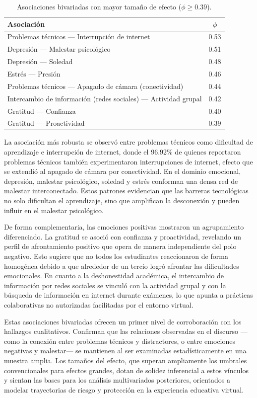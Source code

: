 \documentclass[conference]{IEEEtran}
\begin{document}
\begin{table}[htbp]
\centering
\begin{tabular}{@{}p{}c@{}}
\toprule
\textbf{Asociación} & \textbf{$\phi$} \\
\midrule
Problemas técnicos --- Interrupción de internet & 0.53 \\
Depresión --- Malestar psicológico & 0.51 \\
Depresión --- Soledad & 0.48 \\
Estrés --- Presión & 0.46 \\
Problemas técnicos --- Apagado de cámara (conectividad) & 0.44 \\
Intercambio de información (redes sociales) --- Actividad grupal & 0.42 \\
Gratitud --- Confianza & 0.40 \\
Gratitud --- Proactividad & 0.39 \\
\bottomrule
\end{tabular}
\caption{Asociaciones bivariadas con mayor tamaño de efecto ($\phi \geq 0.39$).}
\label{tab:bivariado}
\end{table}

La asociación más robusta se observó entre problemas técnicos como dificultad de aprendizaje e interrupción de internet, donde el 96.92\% de quienes reportaron problemas técnicos también experimentaron interrupciones de internet, efecto que se extendió al apagado de cámara por conectividad. En el dominio emocional, depresión, malestar psicológico, soledad y estrés conforman una densa red de malestar interconectado. Estos patrones evidencian que las barreras tecnológicas no solo dificultan el aprendizaje, sino que amplifican la desconexión y pueden influir en el malestar psicológico.  

De forma complementaria, las emociones positivas mostraron un agrupamiento diferenciado. La gratitud se asoció con confianza y proactividad, revelando un perfil de afrontamiento positivo que opera de manera independiente del polo negativo. Esto sugiere que no todos los estudiantes reaccionaron de forma homogénea debido a que alrededor de un tercio logró afrontar las dificultades emocionales. En cuanto a la deshonestidad académica, el intercambio de información por redes sociales se vinculó con la actividad grupal y con la búsqueda de información en internet durante exámenes, lo que apunta a prácticas colaborativas no autorizadas facilitadas por el entorno virtual.

Estas asociaciones bivariadas ofrecen un primer nivel de corroboración con los hallazgos cualitativos. Confirman que las relaciones observadas en el discurso —como la conexión entre problemas técnicos y distractores, o entre emociones negativas y malestar— se mantienen al ser examinadas estadísticamente en una muestra amplia. Los tamaños del efecto, que superan ampliamente los umbrales convencionales para efectos grandes, dotan de solidez inferencial a estos vínculos y sientan las bases para los análisis multivariados posteriores, orientados a modelar trayectorias de riesgo y protección en la experiencia educativa virtual.
\end{document}
